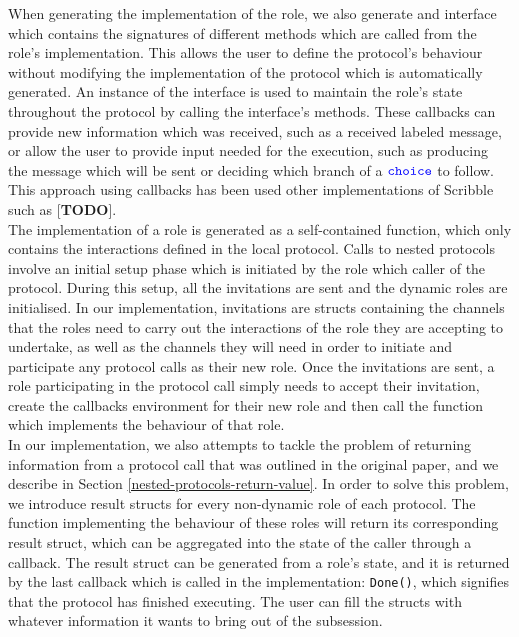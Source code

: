 \documentclass[12pt,twoside]{report}
\begin{document}
When generating the implementation of the role, we also generate and interface which contains the signatures of different methods which are called from the role's implementation. This allows the user to define the protocol's behaviour without modifying the implementation of the protocol which is automatically generated. An instance of the interface is used to maintain the role's state throughout the protocol by calling the interface's methods. These callbacks can provide new information which was received, such as a received labeled message, or allow the user to provide input needed for the execution, such as producing the message which will be sent or deciding which branch of a ${\color{blue}\mathtt{choice}}$ to follow. This approach using callbacks has been used other implementations of Scribble such as [\textbf{TODO}].\\

The implementation of a role is generated as a self-contained function, which only contains the interactions defined in the local protocol. Calls to nested protocols involve an initial setup phase which is initiated by the role which caller of the protocol. During this setup, all the invitations are sent and the dynamic roles are initialised. In our implementation, invitations are structs containing the channels that the roles need to carry out the interactions of the role they are accepting to undertake, as well as the channels they will need in order to initiate and participate any protocol calls as their new role. Once the invitations are sent, a role participating in the protocol call simply needs to accept their invitation, create the callbacks environment for their new role and then call the function which implements the behaviour of that role.\\

In our implementation, we also attempts to tackle the problem of returning information from a protocol call that was outlined in the original paper\cite{nestedprotocols}, and we describe in Section \ref{nested-protocols-return-value}. In order to solve this problem, we introduce result structs for every non-dynamic role of each protocol. The function implementing the behaviour of these roles will return its corresponding result struct, which can be aggregated into the state of the caller through a callback. The result struct can be generated from a role's state, and it is returned by the last callback which is called in the implementation: \texttt{Done()}, which signifies that the protocol has finished executing. The user can fill the structs with whatever information it wants to bring out of the subsession.\\
\end{document}
